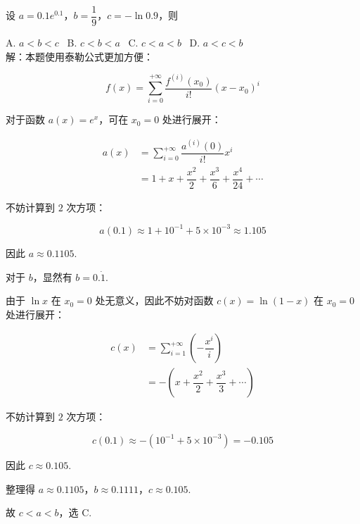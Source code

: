 \documentclass[UTF8]{ctexart}
\newcommand{\lt}{<}
\begin{document}
\thispagestyle{empty}
\pagestyle{empty}

\noindent 设 $a=0.1e^{0.1}$，$b=\dfrac{1}{9}$，$c=-\ln 0.9$，则

\noindent A. $a \lt b \lt c$ \,
B. $c \lt b \lt a$ \,
C. $c \lt a \lt b$ \,
D. $a \lt c \lt b$ \\

\noindent 解：本题使用泰勒公式更加方便：

$$f(x)=\sum_{i=0}^{+\infty} \dfrac{f^{(i)}(x_0)}{i!} (x-x_0)^i$$

\noindent 对于函数 $a(x)=e^x$，可在 $x_0=0$ 处进行展开：

\begin{align*}
a(x) &= \sum_{i=0}^{+\infty} \dfrac{a^{(i)}(0)}{i!} x^i \\
&= 1+x+\dfrac{x^2}{2}+\dfrac{x^3}{6}+
\dfrac{x^4}{24}+\cdots
\end{align*}

\noindent 不妨计算到 $2$ 次方项：

$$a(0.1) \approx 1+10^{-1}+5 \times 10^{-3} \approx 1.105$$

\noindent 因此 $a \approx 0.1105$.

\noindent 对于 $b$，显然有 $b=0.\dot 1$.

\noindent 由于 $\ln x$ 在 $x_0=0$ 处无意义，因此不妨对函数 $c(x)=\ln (1-x)$ 在 $x_0=0$ 处进行展开：

\begin{align*}
c(x) &= \sum_{i=1}^{+\infty} (-\dfrac{x^i}{i}) \\
&= -(x+\dfrac{x^2}{2}+\dfrac{x^3}{3}+\cdots)
\end{align*}

\noindent 不妨计算到 $2$ 次方项：

$$c(0.1) \approx -(10^{-1}+5 \times 10^{-3})=-0.105$$

\noindent 因此 $c \approx 0.105$.

\noindent 整理得 $a \approx 0.1105$，$b \approx 0.1111$，$c \approx 0.105$.

\noindent 故 $c \lt a \lt b$，选 C.
\end{document}

